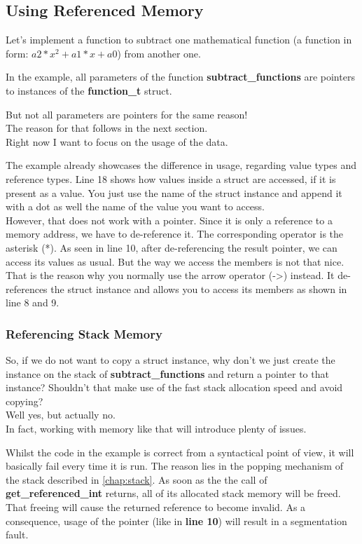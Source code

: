 \documentclass{article}
\begin{document}
  \subsection{Using Referenced Memory}
  \label{chap:using-referenced-memory}
  Let's implement a function to subtract one mathematical function (a function in form: $a2 * x^2 + a1 * x + a0$) from another one.
  
  In the example, all parameters of the function \textbf{subtract\_functions} are pointers to instances of the \textbf{function\_t} struct.
  \begin{center}
    But not all parameters are pointers for the same reason!
    \\The reason for that follows in the next section.
    \\Right now I want to focus on the usage of the data.
  \end{center}
  The example already showcases the difference in usage, regarding value types and reference types.
  Line 18 shows how values inside a struct are accessed, if it is present as a value.
  You just use the name of the struct instance and append it with a dot as well the name of the value you want to access.
  \\However, that does not work with a pointer.
  Since it is only a reference to a memory address, we have to de-reference it.
  The corresponding operator is the asterisk (*).
  As seen in line 10, after de-referencing the result pointer, we can access its values as usual.
  But the way we access the members is not that nice.
  That is the reason why you normally use the arrow operator (->) instead.
  It de-references the struct instance and allows you to access its members as shown in line 8 and 9.
  \newpage
  \subsubsection{Referencing Stack Memory}
  \label{chap:referencing-stack-memory}
  So, if we do not want to copy a struct instance, why don't we just create the instance on the stack of \textbf{subtract\_functions} and return a pointer to that instance?
  Shouldn't that make use of the fast stack allocation speed and avoid copying?
  \\[.2cm]
  Well yes, but actually no.
  \\In fact, working with memory like that will introduce plenty of issues.
  
  Whilst the code in the example is correct from a syntactical point of view, it will basically fail every time it is run.
  The reason lies in the popping mechanism of the stack described in \autoref{chap:stack}.
  As soon as the the call of \textbf{get\_referenced\_int} returns, all of its allocated stack memory will be freed.
  That freeing will cause the returned reference to become invalid.
  As a consequence, usage of the pointer (like in \textbf{line 10}) will result in a segmentation fault.
\end{document}

